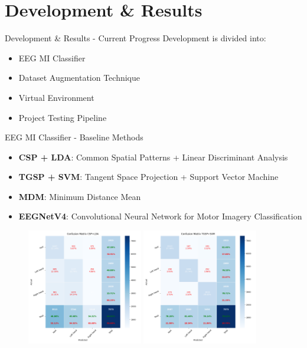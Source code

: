 \section{Development \& Results}
\begin{frame}{Development \& Results - Current Progress}
Development is divided into:
\begin{itemize}
    \item EEG MI Classifier
    \item Dataset Augmentation Technique
    \item Virtual Environment
    \item Project Testing Pipeline
\end{itemize}
\end{frame}

\begin{frame}{EEG MI Classifier - Baseline Methods}
    \begin{minipage}[c]{.65\textwidth}
        \begin{itemize}
            \item \textbf{CSP + LDA}: Common Spatial Patterns + Linear Discriminant Analysis
            \item \textbf{TGSP + SVM}: Tangent Space Projection + Support Vector Machine
            \item \textbf{MDM}: Minimum Distance Mean
            \item \textbf{EEGNetV4}: Convolutional Neural Network for Motor Imagery Classification
        \end{itemize}        
    \end{minipage}
    \begin{minipage}[c]{.33\textwidth}
        \begin{figure}[htpb!]
            \centering
            \includegraphics[width=0.45\textwidth]{figures/classification/confusion_matrix_csp_lda}
            \includegraphics[width=0.45\textwidth]{figures/classification/confusion_matrix_tgsp_svm}

\end{figure}
\end{minipage}
\end{frame}
